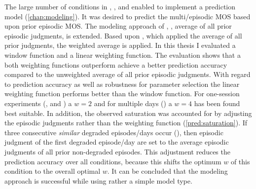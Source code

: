 The large number of conditions in , \EIIa{}, and  enabled to implement a prediction model (\autoref{chap:modeling}).
It was desired to predict the multi\-/episodic \ac{MOS} based upon prior episodic \ac{MOS}.
The modeling approach of \cite{moller_single-call_2011}, \ie, average of all prior episodic judgments, is extended.
Based upon \cite{moller_single-call_2011}, which applied the average of all prior judgments, the weighted average is applied.
In this thesis I evaluated a window function and a linear weighting function.
The evaluation shows that a both weighting functions outperform achieve a better prediction accuracy compared to the unweighted average of all prior episodic judgments.
With regard to prediction accuracy as well as robustness for parameter selection the linear weighting function performs better than the window function.
For one-session experiments (, and \EIIa{}) a $\mathit{w}=2$ and for multiple days () a $\mathit{w}=4$ has been found best suitable.
In addition, the observed saturation was accounted for by adjusting the episodic judgments rather than the weighting function (\autoref{pred:saturation}).
If three consecutive \emph{similar} degraded episodes/days occur (), then episodic judgment of the first degraded episode/day are set to the average episodic judgments of all prior non-degraded episodes.
This adjustment reduces the prediction accuracy over all conditions, because this shifts the optimum $\mathit{w}$ of this condition to the overall optimal $\mathit{w}$.
It can be concluded that the modeling approach is successful while using rather a simple model type.


